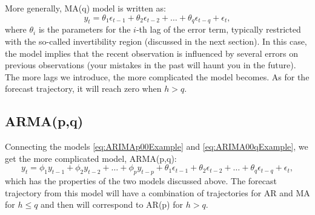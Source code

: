 \documentclass[]{book}
\theoremstyle{definition}
\theoremstyle{definition}
\theoremstyle{definition}
\theoremstyle{definition}
\theoremstyle{remark}
\begin{document}
More generally, MA(q) model is written as:
\begin{equation}
  {y}_{t} = \theta_1 \epsilon_{t-1} + \theta_2 \epsilon_{t-2} + \dots + \theta_q \epsilon_{t-q} + \epsilon_t ,
  \label{eq:ARIMA00qExample}
\end{equation}
where \(\theta_i\) is the parameters for the \(i\)-th lag of the error term, typically restricted with the so-called invertibility region (discussed in the next section). In this case, the model implies that the recent observation is influenced by several errors on previous observations (your mistakes in the past will haunt you in the future). The more lags we introduce, the more complicated the model becomes. As for the forecast trajectory, it will reach zero when \(h>q\).

\hypertarget{ARMA}{%
\subsection{ARMA(p,q)}\label{ARMA}}

Connecting the models \eqref{eq:ARIMAp00Example} and \eqref{eq:ARIMA00qExample}, we get the more complicated model, ARMA(p,q):
\begin{equation}
  {y}_{t} = \phi_1 y_{t-1} + \phi_2 y_{t-2} + \dots + \phi_p y_{t-p} + \theta_1 \epsilon_{t-1} + \theta_2 \epsilon_{t-2} + \dots + \theta_q \epsilon_{t-q} + \epsilon_t ,
  \label{eq:ARIMAp0q}
\end{equation}
which has the properties of the two models discussed above. The forecast trajectory from this model will have a combination of trajectories for AR and MA for \(h \leq q\) and then will correspond to AR(p) for \(h>q\).
\end{document}
